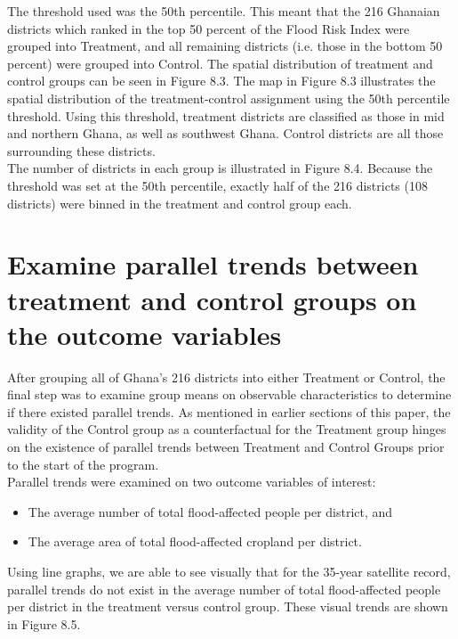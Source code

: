 The threshold used was the 50th percentile. This meant that the 216 Ghanaian districts which ranked in the top 50 percent of the Flood Risk Index were grouped into Treatment, and all remaining districts (i.e. those in the bottom 50 percent) were grouped into Control. The spatial distribution of treatment and control groups can be seen in Figure 8.3. The map in Figure 8.3 illustrates the spatial distribution of the treatment-control assignment using the 50th percentile threshold. Using this threshold, treatment districts are classified as those in  mid and northern Ghana, as well as southwest Ghana. Control districts are all those surrounding these districts. \\

The number of districts in each group is illustrated in Figure 8.4. Because the threshold was set at the 50th percentile, exactly half of the 216 districts (108 districts) were binned in the treatment and control group each.

\section{Examine parallel trends between treatment and control groups on the outcome variables}

After grouping all of Ghana’s 216 districts into either Treatment or Control, the final step was to examine group means on observable characteristics to determine if there existed parallel trends. As mentioned in earlier sections of this paper, the validity of the Control group as a counterfactual for the Treatment group hinges on the existence of parallel trends between Treatment and Control Groups prior to the start of the program. \\

Parallel trends were examined on two outcome variables of interest:

\begin{itemize}
    \item The average number of total flood-affected people per district, and
    \item The average area of total flood-affected cropland per district.
\end{itemize}

Using line graphs, we are able to see visually that for the 35-year satellite record, parallel trends do not exist in the average number of total flood-affected people per district in the treatment versus control group. These visual trends are shown in Figure 8.5. \\

